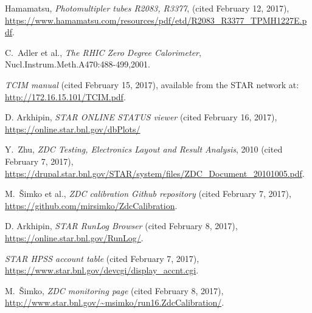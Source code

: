 \begin{thebibliography}{9}
 Hamamatsu, \textit{Photomultipler tubes R2083, R3377}, 
(cited February 12, 2017),
\url{https://www.hamamatsu.com/resources/pdf/etd/R2083_R3377_TPMH1227E.pdf}.

 C.\ Adler et al., \textit{The RHIC Zero Degree Calorimeter},
Nucl.Instrum.Meth.A470:488-499,2001.

 \textit{TCIM manual} (cited February 15, 2017), available from the STAR network 
at: \url{http://172.16.15.101/TCIM.pdf}.

 D. Arkhipin, \textit{STAR ONLINE STATUS viewer} (cited February 16, 2017),
\url{https://online.star.bnl.gov/dbPlots/}

 Y.\ Zhu, \textit{ZDC Testing, Electronics Layout and Result Analysis}, 2010
(cited February 7, 2017),
\url{https://drupal.star.bnl.gov/STAR/system/files/ZDC_Document_20101005.pdf}.

 M.\ Šimko et al., \textit{ZDC calibration Github repository}
(cited February 7, 2017), \url{https://github.com/mirsimko/ZdcCalibration}.

 D. Arkhipin, \textit{STAR RunLog Browser} (cited February 8, 2017),
\url{https://online.star.bnl.gov/RunLog/}.

 \textit{STAR HPSS account table} (cited February 7, 2017),
\url{https://www.star.bnl.gov/devcgi/display_accnt.cgi}.

 M.\ Šimko, \textit{ZDC monitoring page} (cited February 8, 2017),
\url{http://www.star.bnl.gov/~msimko/run16.ZdcCalibration/}.
\end{thebibliography}
